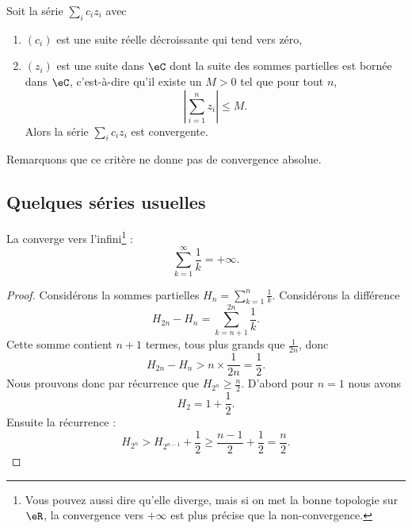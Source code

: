 \begin{proposition}
	Soit la série \( \sum_i c_iz_i\) avec
	\begin{enumerate}
		\item \( (c_i)\) est une suite réelle décroissante qui tend vers zéro,
		\item \( (z_i)\) est une suite dans \( \eC\) dont la suite des sommes partielles est bornée dans \( \eC\), c'est-à-dire qu'il existe un \( M>0\) tel que pour tout \( n\),
		      \begin{equation}
			      \left| \sum_{i=1}^nz_i \right| \leq M.
		      \end{equation}
		      Alors la série \( \sum_ic_iz_i\) est convergente.
	\end{enumerate}
\end{proposition}
Remarquons que ce critère ne donne pas de convergence absolue.

\subsection{Quelques séries usuelles}
\label{SUBSECooDTYHooZjXXJf}

\begin{proposition}       \label{PROPooBAIWooKxMLvh}
	La  converge vers l'infini\footnote{Vous pouvez aussi dire qu'elle diverge, mais si on met la bonne topologie sur \( \eR\), la convergence vers \( +\infty\) est plus précise que la non-convergence.} :
	\begin{equation}
		\sum_{k=1}^\infty \frac{1}{ k }=+\infty.
	\end{equation}
\end{proposition}

\begin{proof}
	Considérons la sommes partielles \( H_n=\sum_{k=1}^n\frac{1}{ k }\). Considérons la différence
	\begin{equation}
		H_{2n}-H_n=\sum_{k=n+1}^{2n}\frac{1}{ k }.
	\end{equation}
	Cette somme contient \( n+1\) termes, tous plus grands que \( \frac{1}{ 2n }\), donc
	\begin{equation}
		H_{2n}-H_n > n\times\frac{1}{ 2n }=\frac{ 1 }{2}.
	\end{equation}
	Nous prouvons donc par récurrence que \( H_{2^n}\geq \frac{ n }{2}\). D'abord pour \( n=1\) nous avons
	\begin{equation}
		H_2=1+\frac{ 1 }{2}.
	\end{equation}
	Ensuite la récurrence :
	\begin{equation}
		H_{2^n}>H_{2^{n-1}}+\frac{ 1 }{2}\geq \frac{ n-1 }{ 2 }+\frac{ 1 }{2}=\frac{ n }{2}.
	\end{equation}
\end{proof}

